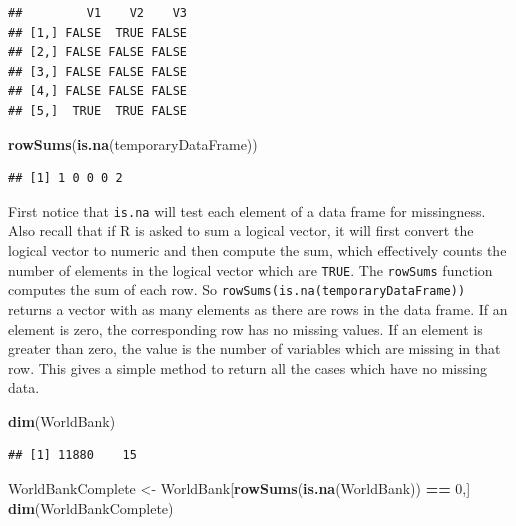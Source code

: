\documentclass[
]{krantz}
\newenvironment{Shaded}{\begin{snugshade}}{\end{snugshade}}
\newcommand{\DecValTok}[1]{\textcolor[rgb]{0.00,0.00,0.81}{#1}}
\newcommand{\KeywordTok}[1]{\textcolor[rgb]{0.13,0.29,0.53}{\textbf{#1}}}
\newcommand{\NormalTok}[1]{#1}
\newcommand{\OperatorTok}[1]{\textcolor[rgb]{0.81,0.36,0.00}{\textbf{#1}}}
\newcommand{\StringTok}[1]{\textcolor[rgb]{0.31,0.60,0.02}{#1}}
\begin{document}
\begin{verbatim}
##         V1    V2    V3
## [1,] FALSE  TRUE FALSE
## [2,] FALSE FALSE FALSE
## [3,] FALSE FALSE FALSE
## [4,] FALSE FALSE FALSE
## [5,]  TRUE  TRUE FALSE
\end{verbatim}

\begin{Shaded}
\begin{Highlighting}[]
\KeywordTok{rowSums}\NormalTok{(}\KeywordTok{is.na}\NormalTok{(temporaryDataFrame))}
\end{Highlighting}
\end{Shaded}

\begin{verbatim}
## [1] 1 0 0 0 2
\end{verbatim}

First notice that \texttt{is.na} will test each element of a data frame for missingness. Also recall that if R is asked to sum a logical vector, it will first convert the logical vector to numeric and then compute the sum, which effectively counts the number of elements in the logical vector which are \texttt{TRUE}. The \texttt{rowSums} function computes the sum of each row. So \texttt{rowSums(is.na(temporaryDataFrame))} returns a vector with as many elements as there are rows in the data frame. If an element is zero, the corresponding row has no missing values. If an element is greater than zero, the value is the number of variables which are missing in that row. This gives a simple method to return all the cases which have no missing data.

\begin{Shaded}
\begin{Highlighting}[]
\KeywordTok{dim}\NormalTok{(WorldBank)}
\end{Highlighting}
\end{Shaded}

\begin{verbatim}
## [1] 11880    15
\end{verbatim}

\begin{Shaded}
\begin{Highlighting}[]
\NormalTok{WorldBankComplete \textless{}{-}}\StringTok{ }\NormalTok{WorldBank[}\KeywordTok{rowSums}\NormalTok{(}\KeywordTok{is.na}\NormalTok{(WorldBank)) }\OperatorTok{==}\StringTok{ }\DecValTok{0}\NormalTok{,]}
\KeywordTok{dim}\NormalTok{(WorldBankComplete)}
\end{Highlighting}
\end{Shaded}
\end{document}

